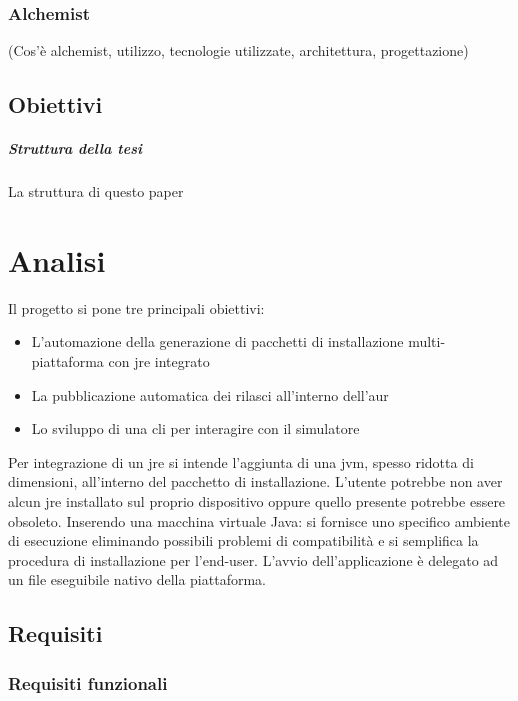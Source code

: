 \documentclass[12pt,a4paper,openright,twoside]{book}
\begin{document}
\subsection{Alchemist}

(Cos'è alchemist, utilizzo, tecnologie utilizzate, architettura, progettazione)

\section{Obiettivi}

\paragraph{Struttura della tesi}

La struttura di questo paper

\chapter{Analisi}

Il progetto si pone tre principali obiettivi:
\begin{itemize}
	\item L'automazione della generazione di pacchetti di installazione multi-piattaforma con \ac{jre} integrato
	\item La pubblicazione automatica dei rilasci all'interno dell'\ac{aur}
	\item Lo sviluppo di una \ac{cli} per interagire con il simulatore
\end{itemize}
Per integrazione di un \ac{jre} si intende l'aggiunta di una \ac{jvm}, spesso ridotta di dimensioni, all'interno del pacchetto di installazione.
L'utente potrebbe non aver alcun \ac{jre} installato sul proprio dispositivo oppure quello presente potrebbe essere obsoleto. Inserendo una macchina virtuale Java: si fornisce uno specifico ambiente di esecuzione eliminando possibili problemi di compatibilità e si semplifica la procedura di installazione per l'end-user. L'avvio dell'applicazione è delegato ad un file eseguibile nativo della piattaforma.

\section{Requisiti}

\subsection{Requisiti funzionali}
\end{document}
